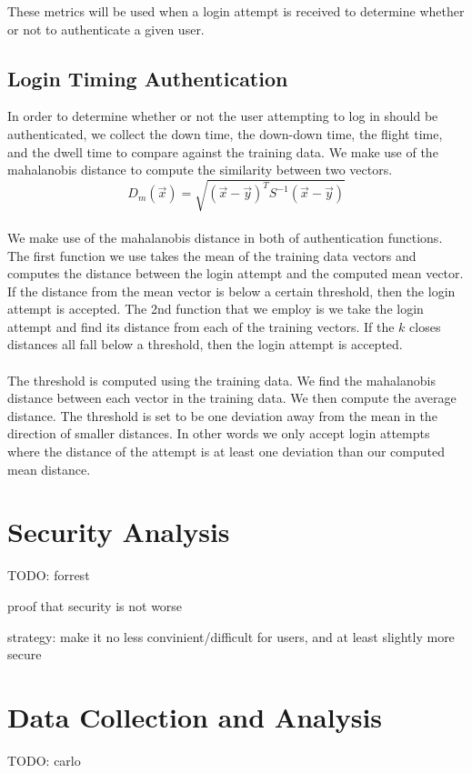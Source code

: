 \documentclass{article}
\begin{document}
These metrics will be used when a login attempt is received to determine whether or not to authenticate a given user.

\subsection{Login Timing Authentication}
In order to determine whether or not the user attempting to log in should be authenticated, we collect the down time, the down-down time, the flight time, and the dwell time to compare against the training data. We make use of the mahalanobis distance to compute the similarity between two vectors.  \\
\begin{displaymath}
D_m(\vec{x}) = \sqrt{(\vec{x}-\vec{y})^T S^{-1} (\vec{x}-\vec{y})}
\end{displaymath} \\
We make use of the mahalanobis distance in both of authentication functions. The first function we use takes the mean of the training data vectors and computes the distance between the login attempt and the computed mean vector. If the distance from the mean vector is below a certain threshold, then the login attempt is accepted. The 2nd function that we employ is we take the login attempt and find its distance from each of the training vectors. If the $k$ closes distances all fall below a threshold, then the login attempt is accepted. \\ \\
The threshold is computed using the training data. We find the mahalanobis distance between each vector in the training data. We then compute the average distance. The threshold is set to be one deviation away from the mean in the direction of smaller distances. In other words we only accept login attempts where the distance of the attempt is at least one deviation than our computed mean distance. 
\section{Security Analysis}
TODO: forrest

proof that security is not worse

strategy: make it no less convinient/difficult for users, and at least slightly more secure

\section{Data Collection and Analysis}
TODO: carlo
\end{document}
